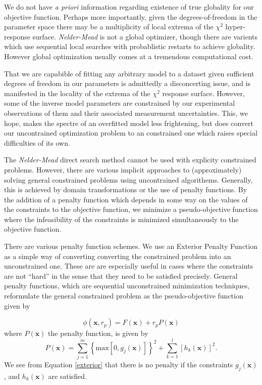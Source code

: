 \documentclass[10pt,a4paper]{article}
\begin{document}
We do not have \emph{a priori} information regarding existence of true globality for our objective function. Perhaps more importantly, given the degrees-of-freedom in the parameter space there may be a multiplicity of local extrema of the $\chi^2$ hyper-response surface. \emph{Nelder-Mead} is not a global optimizer, though there are varients which use sequential local searches with probablistic restarts to achieve globality. However global optimization usually comes at a tremendous computational cost.

That we are capabible of fitting any arbitrary model to a dataset given sufficient degrees of freedom in our parameters is admittedly a disconcerting issue, and is manifested in the locality of the extrema of the $\chi^2$ response surface. However, some of the inverse model parameters are constrained by our experimental observations of them and their associated measurement uncertainties. This, we hope, makes the spectre of an overfitted model less frightening, but does convert our uncontrained optimization problem to an constrained one which raises special difficulties of its own. 

The \emph{Nelder-Mead} direct search method cannot be used with explicity constrained problems. However, there are various implicit approaches to (approximately) solving general constrained problems using uncontrained algorithems. Generally, this is achieved by domain transformations or the use of penalty functions.  By the addition of a penalty function which depends in some way on the values of the constraints to the objective function, we minimize a pseudo-objective function where the infeasibility of the constraints is minimized simultaneously to the objective function. 

There are various penalty function schemes. We use an Exterior Penalty Function as a simple way of converting converting the constrained problem into an unconstrained one. These are are especially useful in cases where the constraints are not ``hard'' in the sense that they need to be satisfied precisely. General penalty functions, which are sequential unconstrained minimization techniques, reformulate the general constrained problem as the pseudo-objective function given by

\[ \phi(\mathbf{x}, r_p ) = F(\mathbf{x}) + r_p P(\mathbf{x}) \]
where $P \left( \mathbf{x} \right)$ the penalty function, is given by
\begin{equation} \label{exterior}
 P( \mathbf{x} ) = \sum_{j = 1}^m \left\lbrace \mbox{max} \left[ 0, g_j(\mathbf{x} ) \right] \right\rbrace^2 + 
\sum_{k = 1}^l \left[ h_k( \mathbf{x}) \right]^2 .
\end{equation}
We see from Equation \ref{exterior} that there is no penalty if the constraints $g_j(\mathbf{x})$, and $h_k(\mathbf{x})$ are satisfied.
 
\end{document}
